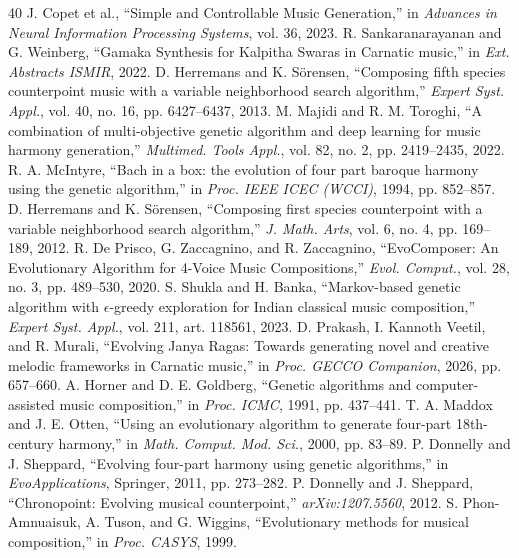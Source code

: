 \documentclass[conference,letterpaper]{IEEEtran}
\newcounter{algorithm}
\begin{document}
\begin{thebibliography}{40}
 J. Copet et al., ``Simple and Controllable Music Generation,'' in \emph{Advances in Neural Information Processing Systems}, vol. 36, 2023.
 R. Sankaranarayanan and G. Weinberg, ``Gamaka Synthesis for Kalpitha Swaras in Carnatic music,'' in \emph{Ext. Abstracts ISMIR}, 2022.
 D. Herremans and K. S{\"o}rensen, ``Composing fifth species counterpoint music with a variable neighborhood search algorithm,'' \emph{Expert Syst. Appl.}, vol. 40, no. 16, pp. 6427--6437, 2013.
 M. Majidi and R. M. Toroghi, ``A combination of multi-objective genetic algorithm and deep learning for music harmony generation,'' \emph{Multimed. Tools Appl.}, vol. 82, no. 2, pp. 2419--2435, 2022.
 R. A. McIntyre, ``Bach in a box: the evolution of four part baroque harmony using the genetic algorithm,'' in \emph{Proc. IEEE ICEC (WCCI)}, 1994, pp. 852--857.
 D. Herremans and K. S{\"o}rensen, ``Composing first species counterpoint with a variable neighborhood search algorithm,'' \emph{J. Math. Arts}, vol. 6, no. 4, pp. 169--189, 2012.
 R. De Prisco, G. Zaccagnino, and R. Zaccagnino, ``EvoComposer: An Evolutionary Algorithm for 4-Voice Music Compositions,'' \emph{Evol. Comput.}, vol. 28, no. 3, pp. 489--530, 2020.
 S. Shukla and H. Banka, ``Markov-based genetic algorithm with $\epsilon$-greedy exploration for Indian classical music composition,'' \emph{Expert Syst. Appl.}, vol. 211, art. 118561, 2023.
 D. Prakash, I. Kannoth Veetil, and R. Murali, ``Evolving Janya Ragas: Towards generating novel and creative melodic frameworks in Carnatic music,'' in \emph{Proc. GECCO Companion}, 2026, pp. 657--660.
 A. Horner and D. E. Goldberg, ``Genetic algorithms and computer-assisted music composition,'' in \emph{Proc. ICMC}, 1991, pp. 437--441.
 T. A. Maddox and J. E. Otten, ``Using an evolutionary algorithm to generate four-part 18th-century harmony,'' in \emph{Math. Comput. Mod. Sci.}, 2000, pp. 83--89.
 P. Donnelly and J. Sheppard, ``Evolving four-part harmony using genetic algorithms,'' in \emph{EvoApplications}, Springer, 2011, pp. 273--282.
 P. Donnelly and J. Sheppard, ``Chronopoint: Evolving musical counterpoint,'' \emph{arXiv:1207.5560}, 2012.
 S. Phon-Amnuaisuk, A. Tuson, and G. Wiggins, ``Evolutionary methods for musical composition,'' in \emph{Proc. CASYS}, 1999.

\end{thebibliography}
\end{document}
